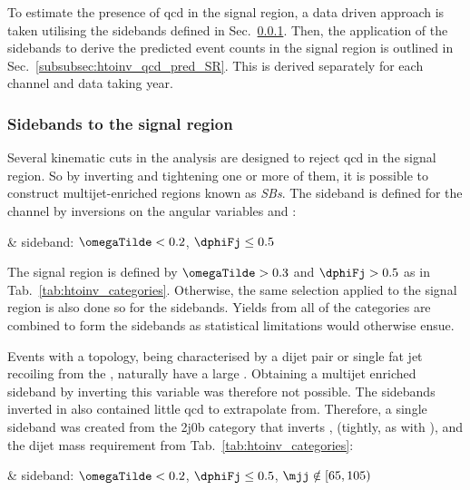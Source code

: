 To estimate the presence of \acrshort{qcd} in the signal region, a data driven approach is taken utilising the sidebands defined in Sec.~\ref{subsubsec:htoinv_sidebands}. Then, the application of the sidebands to derive the predicted event counts in the signal region is outlined in Sec.~\ref{subsubsec:htoinv_qcd_pred_SR}. This is derived separately for each channel and data taking year.




\subsubsection{Sidebands to the signal region}
\label{subsubsec:htoinv_sidebands}

Several kinematic cuts in the analysis are designed to reject \acrshort{qcd} in the signal region. So by inverting and tightening one or more of them, it is possible to construct multijet-enriched regions known as \emph{\glspl{SB}}. The sideband is defined for the \ttH channel by inversions on the angular variables \omegaTilde and \dphiFj:

\medskip
\begin{easylist}[itemize]
    \easylistprops
    & \ttH sideband: $\omegaTilde < \text{0.2}$, $\dphiFj \leq \text{0.5}$
\end{easylist}

\medskip

\noindent{}The signal region is defined by $\omegaTilde > \text{0.3}$ and $\dphiFj > \text{0.5}$ as in Tab.~\ref{tab:htoinv_categories}. Otherwise, the same selection applied to the signal region is also done so for the sidebands. Yields from all of the \ttH categories are combined to form the sidebands as statistical limitations would otherwise ensue.

Events with a \VH topology, being characterised by a dijet pair or single fat jet recoiling from the \ptvecmiss, naturally have a large \mindphiJetMet. Obtaining a multijet enriched sideband by inverting this variable was therefore not possible. The sidebands inverted in \omegaTilde also contained little \acrshort{qcd} to extrapolate from. Therefore, a single sideband was created from the 2j0b category that inverts \mindphi, \omegaTilde (tightly, as with \ttH), and the dijet mass requirement from Tab.~\ref{tab:htoinv_categories}:

\medskip
\begin{easylist}[itemize]
    \easylistprops
    & \VH sideband: $\omegaTilde < \text{0.2}$, $\dphiFj \leq \text{0.5}$, $\mjj \notin [\text{65}, \text{105})$
\end{easylist}

